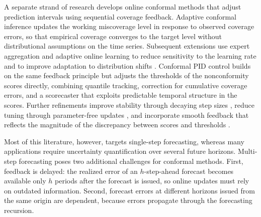 \documentclass[
  american,
  12pt]{article}
\theoremstyle{plain}
\theoremstyle{plain}
\theoremstyle{remark}
\begin{document}
A separate strand of research develops online conformal methods that
adjust prediction intervals using sequential coverage feedback. Adaptive
conformal inference \citep[ACI,][]{gibbs2021} updates the working
miscoverage level in response to observed coverage errors, so that
empirical coverage converges to the target level without distributional
assumptions on the time series. Subsequent extensions use expert
aggregation and adaptive online learning to reduce sensitivity to the
learning rate and to improve adaptation to distribution shifts
\citep{zaffran2022, gibbs2024, bhatnagar2023}. Conformal PID control
\citep{angelopoulos2024} builds on the same feedback principle but
adjusts the thresholds of the nonconformity scores directly, combining
quantile tracking, correction for cumulative coverage errors, and a
scorecaster that exploits predictable temporal structure in the scores.
Further refinements improve stability through decaying step sizes
\citep{angelopoulos2024online}, reduce tuning through parameter-free
updates \citep{podkopaev2024}, and incorporate smooth feedback that
reflects the magnitude of the discrepancy between scores and thresholds
\citep{wu2025}.

Most of this literature, however, targets single-step forecasting,
whereas many applications require uncertainty quantification over
several future horizons. Multi-step forecasting poses two additional
challenges for conformal methods. First, feedback is delayed: the
realized error of an \(h\)-step-ahead forecast becomes available only
\(h\) periods after the forecast is issued, so online updates must rely
on outdated information. Second, forecast errors at different horizons
issued from the same origin are dependent, because errors propagate
through the forecasting recursion.
\end{document}
